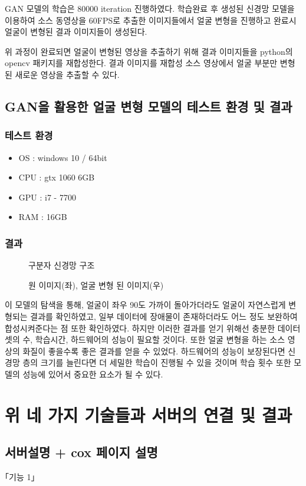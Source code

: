 \documentclass{oblivoir}
\newcommand{\spec}{
    \begin{itemize}
        \item OS : windows 10 / 64bit
        \item CPU : gtx 1060 6GB
        \item GPU : i7 - 7700
        \item RAM : 16GB
    \end{itemize}
    }
\begin{document}
\begin{enumerate}
    GAN 모델의 학습은 80000 iteration 진행하였다. 학습완료 후 생성된 신경망 모델을 이용하여 소스 동영상을 60FPS로 추출한 이미지들에서 얼굴 변형을 진행하고 완료시 얼굴이 변형된 결과 이미지들이 생성된다.

    위 과정이 완료되면 얼굴이 변형된 영상을 추출하기 위해 결과 이미지들을 python의 opencv 패키지를 재합성한다. 결과 이미지를 재합성 소스 영상에서 얼굴 부분만 변형된 새로운 영상을 추출할 수 있다.

    \section{ GAN을 활용한 얼굴 변형 모델의 테스트 환경 및 결과}

    \subsection{테스트 환경}
    \spec
    \subsection{결과}

    \begin{figure}[h!]
    \centering
    \caption{구분자 신경망 구조\cite{reference11}}
    \end{figure}

    \begin{figure}[h!]
    \centering
    \caption{원 이미지(좌), 얼굴 변형 된 이미지(우)}
    \end{figure}


    이 모델의 탐색을 통해, 얼굴이 좌우 90도 가까이 돌아가더라도 얼굴이 자연스럽게 변형되는 결과를 확인하였고, 일부 데이터에 장애물이 존재하더라도 어느 정도 보완하여 합성시켜준다는 점 또한 확인하였다. 하지만 이러한 결과를 얻기 위해선 충분한 데이터 셋의 수, 학습시간, 하드웨어의 성능이 필요할 것이다. 또한 얼굴 변형을 하는 소스 영상의 화질이 좋을수록 좋은 결과를 얻을 수 있었다. 하드웨어의 성능이 보장된다면 신경망 층의 크기를 늘린다면 더 세밀한 학습이 진행될 수 있을 것이며 학습 횟수 또한 모델의 성능에 있어서 중요한 요소가 될 수 있다.

    \chapter{ 위 네 가지 기술들과 서버의 연결 및 결과  }

    \section{ 서버설명 + cox 페이지 설명}

    \begin{figure}[h!]
    \centering
    \end{figure}

    \begin{figure}[h!]
    \centering
    \end{figure}
\end{enumerate}
｢기능 1｣
\end{document}
